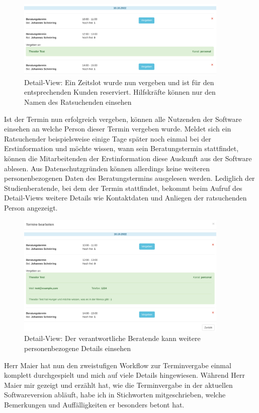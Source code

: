 \documentclass[12pt]{article}
\newcommand{\ipName}{Herr Maier }
\begin{document}
\begin{figure}[h]
    \caption{Detail-View: Ein Zeitslot wurde nun vergeben und ist für den entsprechenden Kunden reserviert. Hilfskräfte können nur den Namen des Ratsuchenden einsehen}
    \centering
    \includegraphics[width=0.9\textwidth]{screen_old_assigned_hiwi.png}
\end{figure}

Ist der Termin nun erfolgreich vergeben, können alle Nutzenden der Software
einsehen an welche Person dieser Termin vergeben wurde. Meldet sich ein
Ratsuchender beispielsweise einige Tage später noch einmal bei der
Erstinformation und möchte wissen, wann sein Beratungstermin stattfindet,
können die Mitarbeitenden der Erstinformation diese Auskunft aus der Software
ablesen. Aus Datenschutzgründen können allerdings keine weiteren
personenbezogenen Daten des Beratungstermins ausgelesen werden. Lediglich der
Studienberatende, bei dem der Termin stattfindet, bekommt beim Aufruf des
Detail-Views weitere Details wie Kontaktdaten und Anliegen der ratsuchenden
Person angezeigt.

\begin{figure}[h]
    \caption{Detail-View: Der verantwortliche Beratende kann weitere personenbezogene Details einsehen}
    \centering
    \includegraphics[width=0.9\textwidth]{screen_old_assigned.png}
\end{figure}

\ipName hat nun den zweistufigen Workflow zur Terminvergabe einmal komplett
durchgespielt und mich auf viele Details hingewiesen. Während \ipName mir
gezeigt und erzählt hat, wie die Terminvergabe in der aktuellen Softwareversion
abläuft, habe ich in Stichworten mitgeschrieben, welche Bemerkungen und
Auffälligkeiten er besonders betont hat.
\end{document}

